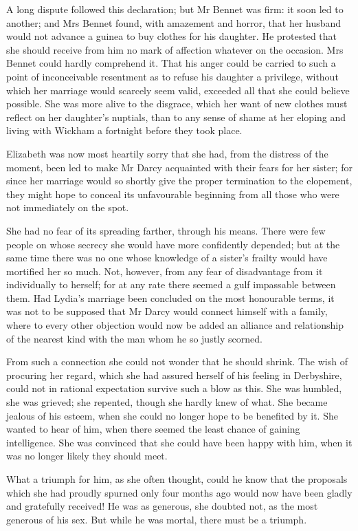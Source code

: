 A long dispute followed this declaration; but Mr Bennet was firm: it soon led to another; and Mrs Bennet found, with amazement and horror, that her husband would not advance a guinea to buy clothes for his daughter. He protested that she should receive from him no mark of affection whatever on the occasion. Mrs Bennet could hardly comprehend it. That his anger could be carried to such a point of inconceivable resentment as to refuse his daughter a privilege, without which her marriage would scarcely seem valid, exceeded all that she could believe possible. She was more alive to the disgrace, which her want of new clothes must reflect on her daughter's nuptials, than to any sense of shame at her eloping and living with Wickham a fortnight before they took place.

Elizabeth was now most heartily sorry that she had, from the distress of the moment, been led to make Mr Darcy acquainted with their fears for her sister; for since her marriage would so shortly give the proper termination to the elopement, they might hope to conceal its unfavourable beginning from all those who were not immediately on the spot.

She had no fear of its spreading farther, through his means. There were few people on whose secrecy she would have more confidently depended; but at the same time there was no one whose knowledge of a sister's frailty would have mortified her so much. Not, however, from any fear of disadvantage from it individually to herself; for at any rate there seemed a gulf impassable between them. Had Lydia's marriage been concluded on the most honourable terms, it was not to be supposed that Mr Darcy would connect himself with a family, where to every other objection would now be added an alliance and relationship of the nearest kind with the man whom he so justly scorned.

From such a connection she could not wonder that he should shrink. The wish of procuring her regard, which she had assured herself of his feeling in Derbyshire, could not in rational expectation survive such a blow as this. She was humbled, she was grieved; she repented, though she hardly knew of what. She became jealous of his esteem, when she could no longer hope to be benefited by it. She wanted to hear of him, when there seemed the least chance of gaining intelligence. She was convinced that she could have been happy with him, when it was no longer likely they should meet.

What a triumph for him, as she often thought, could he know that the proposals which she had proudly spurned only four months ago would now have been gladly and gratefully received! He was as generous, she doubted not, as the most generous of his sex. But while he was mortal, there must be a triumph.

